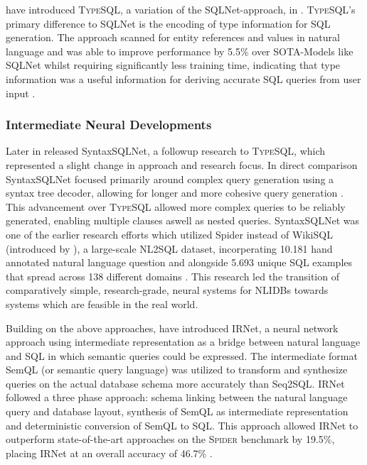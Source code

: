 \documentclass{article}
\begin{document}
\citeauthor*{TypeSQL} have introduced \textsc{TypeSQL}, a variation of the SQLNet-approach, in \citeyear{TypeSQL}.
\textsc{TypeSQL}'s primary difference to SQLNet is the encoding of type information for SQL generation. The approach scanned
for entity references and values in natural language and was able to improve performance by 5.5\% over SOTA-Models like
SQLNet whilst requiring significantly less training time, indicating that type information was a useful information for deriving 
accurate SQL queries from user input \citep{TypeSQL}.

\subsubsection{Intermediate Neural Developments}

Later in \citeyear{SyntaxSQLNet} \citeauthor*{SyntaxSQLNet} released SyntaxSQLNet, a followup research to \textsc{TypeSQL},
which represented a slight change in approach and research focus. In direct comparison SyntaxSQLNet focused primarily around
complex query generation using a syntax tree decoder, allowing for longer and more cohesive query generation \citep{SyntaxSQLNet}.
This advancement over \textsc{TypeSQL} allowed more complex queries to be reliably generated, enabling multiple clauses aswell as
nested queries. SyntaxSQLNet was one of the earlier research efforts which utilized Spider instead of WikiSQL (introduced by 
\cite{Seq2SQL}), a large-scale NL2SQL dataset, incorperating 10.181 hand annotated natural language question and alongside
5.693 unique SQL examples that spread across 138 different domains \citep{Spider}. This research led the transition of
comparatively simple, research-grade, neural systems for NLIDBs towards systems which are feasible in the real world.

Building on the above approaches, \citeauthor*{IRNet} have introduced IRNet, a neural network approach using intermediate
representation as a bridge between natural language and SQL in which semantic queries could be expressed. The intermediate
format SemQL (or semantic query language) was utilized to transform and synthesize queries on the actual database schema more
accurately than Seq2SQL. IRNet followed a three phase approach: schema linking between the natural language query and database
layout, synthesis of SemQL as intermediate representation and deterministic conversion of SemQL to SQL. This approach allowed
IRNet to outperform state-of-the-art approaches on the \textsc{Spider} benchmark by 19.5\%, placing IRNet at an overall accuracy
of 46.7\% \citep{IRNet}.
\end{document}
